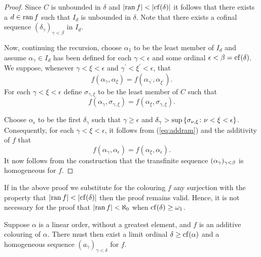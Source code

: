 \begin{proof}
	Since $C$ is unbounded in $\delta$ and $\left\lvert\operatorname{ran} f\right\rvert<\left\lvert\operatorname{cf}(\delta)\right\rvert$
	it follows that there exists a $d\in\operatorname{ran} f$ such that $I_d$ is unbounded
	in $\delta$.  Note that there exists a cofinal sequence
	$(\delta_\gamma)_{\gamma<\beta}$ in $I_d$.

	Now, continuing the recursion, choose $\alpha_1$ to be the least member of
	$I_d$ and assume $\alpha_\gamma\in I_d$ has been defined for each
	$\gamma<\epsilon$ and some ordinal $\epsilon<\beta=\operatorname{cf}(\delta)$.  We
	suppose, whenever $\gamma<\xi<\epsilon$ and
	$\gamma^\prime<\xi^\prime<\epsilon$, that
	\begin{equation}
		f(\alpha_\gamma,\alpha_\xi)=f(\alpha_{\gamma^\prime},\alpha_{\xi^\prime}).
	\end{equation}
	For each $\gamma<\xi<\epsilon$ define $\sigma_{\gamma,\xi}$ to be the least
	member of $C$ such that
	\begin{equation}\label{eq:addram}
		f(\alpha_\gamma,\sigma_{\gamma,\xi})=f(\alpha_\xi,\sigma_{\gamma,\xi}).
	\end{equation}

	Choose $\alpha_\epsilon$ to be the first $\delta_\gamma$ such that
	$\gamma\geq\epsilon$ and
	$\delta_\gamma>\sup\left\lbrace \sigma_{\nu,\xi}\colon \nu<\xi<\epsilon \right\rbrace$.
	Consequently, for each $\gamma<\xi<\epsilon$, it follows from
	(\ref{eq:addram}) and the additivity of $f$ that
	\begin{equation}
		f(\alpha_\gamma,\alpha_\epsilon)=f(\alpha_\xi,\alpha_\epsilon).
	\end{equation}
	It now follows from the construction that the transfinite sequence
	$(\alpha_\gamma)_{\gamma<\beta}$ is homogeneous for $f$.
\end{proof}

\begin{rem}
	If in the above proof we substitute for the colouring $f$ any surjection
	with the property that $\left\lvert\operatorname{ran} f\right\rvert<\left\lvert\operatorname{cf}(\delta)\right\rvert$ then the proof
	remains valid.  Hence, it is not necessary for the proof that $\left\lvert\operatorname{ran}
	f\right\rvert<\aleph_0$ when $\operatorname{cf}(\delta)\geq\omega_1$.
\end{rem}


\begin{cor}
	Suppose $\alpha$ is a linear order, without a greatest element, and $f$ is
	an additive colouring of $\alpha$. There must then exist a limit ordinal
	$\delta\geq\operatorname{cf}(\alpha)$ and a homogeneous sequence
	$(a_\gamma)_{\gamma<\delta}$ for $f$.
\end{cor}

